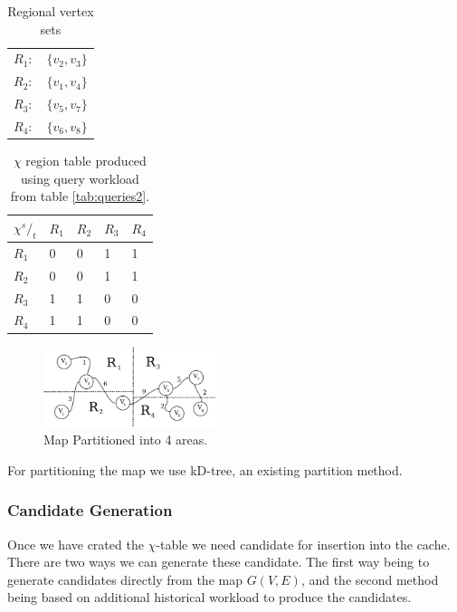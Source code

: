 \begin{table}
\center
\begin{tabular}{ll}
$R_1 :$ 	& $\{v_2,v_3\}$\\
$R_2 :$ 	& $\{v_1,v_4\}$ \\
$R_3 :$ 	& $\{v_5,v_7\}$ \\
$R_4 :$ 	& $\{v_6,v_8\}$ \\
\end{tabular}
\caption{Regional vertex sets}
\label{tab:vperregion}
\end{table}


\begin{table}
\center
\begin{tabular}{|l||l|l|l|l|}
\textbf{$\chi {^s/_t}$}	& $R_1$		& $R_2$		& $R_3$		& $R_4$\\\hline
$R_1$			& 0		& 0		& 1		& 1 \\
$R_2$			& 0		& 0		& 1	 	& 1 \\
$R_3$			& 1		& 1		& 0	 	& 0 \\
$R_4$			& 1		& 1		& 0	 	& 0 \\
\end{tabular}
\caption{$\chi$ region table produced using query workload from table \ref{tab:queries2}.}
\label{tab:rchitable}
\end{table}

\begin{figure}[bht]
  \center
        \includegraphics[width=0.45\textwidth]{figures/mappartition}
        \caption{Map Partitioned into 4 areas.}
  \label{fig:fillcache}
\end{figure}

For partitioning the map we use kD-tree, an existing partition method.




\subsubsection{Candidate Generation}

Once we have crated the $\chi$-table we need candidate \spaths for insertion into the cache. There are two ways we can generate these candidate. The first way being to generate candidates directly from the map $G(V,E)$, and the second method being based on additional historical workload to produce the candidates.

